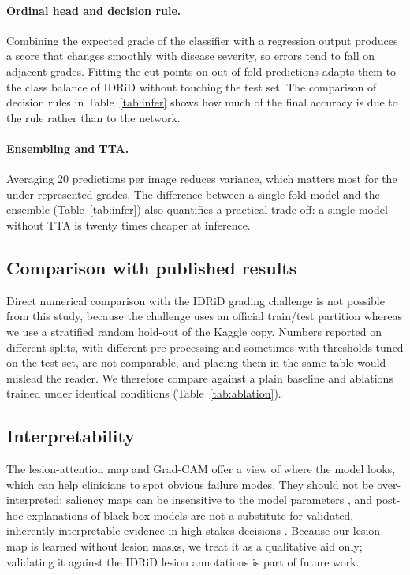 \paragraph{Ordinal head and decision rule.} Combining the expected grade of the classifier with a regression output
produces a score that changes smoothly with disease severity, so errors tend to fall on adjacent grades. Fitting the
cut-points on out-of-fold predictions adapts them to the class balance of IDRiD without touching the test set. The
comparison of decision rules in Table~\ref{tab:infer} shows how much of the final accuracy is due to the rule rather
than to the network. 

\paragraph{Ensembling and TTA.} Averaging 20 predictions per image reduces variance, which matters most for the
under-represented grades. The difference between a single fold model and the ensemble (Table~\ref{tab:infer}) also
quantifies a practical trade-off: a single model without TTA is twenty times cheaper at inference.

\subsection{Comparison with published results}
Direct numerical comparison with the IDRiD grading challenge \citep{porwal2020idrid} is not possible from this study,
because the challenge uses an official train/test partition whereas we use a stratified random hold-out of the Kaggle
copy. Numbers reported on different splits, with different pre-processing and sometimes with thresholds tuned on the
test set, are not comparable, and placing them in the same table would mislead the reader. We therefore compare
against a plain baseline and ablations trained under identical conditions (Table~\ref{tab:ablation}).

\subsection{Interpretability}
The lesion-attention map and Grad-CAM \citep{selvaraju2017gradcam} offer a view of where the model looks, which can help
clinicians to spot obvious failure modes. They should not be over-interpreted: saliency maps can be insensitive to the
model parameters \citep{adebayo2018sanity}, and post-hoc explanations of black-box models are not a substitute for
validated, inherently interpretable evidence in high-stakes decisions \citep{rudin2019stop}. Because our lesion map is
learned without lesion masks, we treat it as a qualitative aid only; validating it against the IDRiD lesion
annotations is part of future work.

